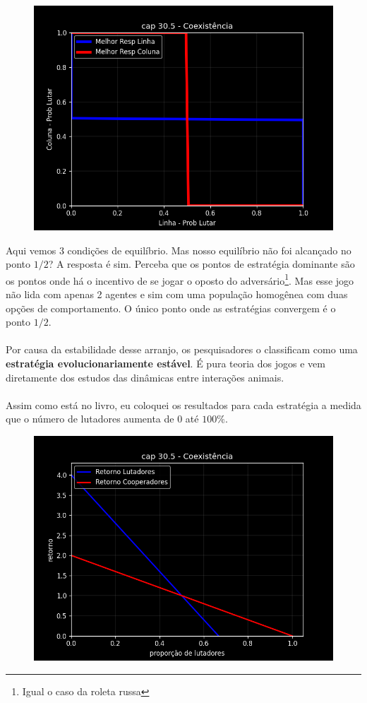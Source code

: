 \documentclass[a4paper,11pt,oneside]{book}
\theoremstyle{definition}
\theoremstyle{break}
\begin{document}
\begin{figure}[H]
\centering
\includegraphics[scale=0.75]{cap30_5-coexistencia_1.png}
\end{figure}

Aqui vemos 3 condições de equilíbrio. Mas nosso equilíbrio não foi alcançado no ponto $1/2$? A resposta é sim. Perceba que os pontos de estratégia dominante são os pontos onde há o incentivo de se jogar o oposto do adversário\footnote{Igual o caso da roleta russa}. Mas esse jogo não lida com apenas 2 agentes e sim com uma população homogênea com duas opções de comportamento. O único ponto onde as estratégias convergem é o ponto $1/2$.
\\~\\
Por causa da estabilidade desse arranjo, os pesquisadores o classificam como uma \textbf{estratégia evolucionariamente estável}. É pura teoria dos jogos e vem diretamente dos estudos das dinâmicas entre interações animais.
\\~\\
Assim como está no livro, eu coloquei os resultados para cada estratégia a medida que o número de lutadores aumenta de $0$ até $100\%$.

\begin{figure}[H]
\centering
\includegraphics[scale=0.75]{cap30_5-coexistencia_2.png}
\end{figure}
\end{document}
